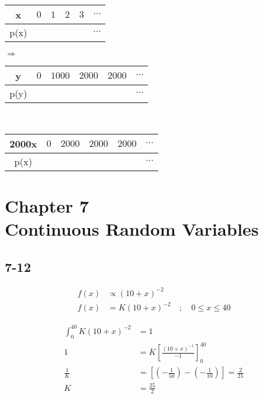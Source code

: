 \documentclass{article}
\begin{document}
			\begin{center}
				\begin{tabular}{c|c|c|c|c|c}
					x & $0$ & $1$ & $2$ & $3$ & $\cdots$ \\
					\hline
					p(x) &  &  &  &  & $\cdots$ \\
				\end{tabular} $\Rightarrow$
				\begin{tabular}{c|c|c|c|c|c}
					y & $0$ & $1000$ & $2000$ & $2000$ & $\cdots$ \\
					\hline
					p(y) &  &  &  &  & $\cdots$ \\
				\end{tabular}
				\\
				\begin{tabular}{c|c|c|c|c|c}
					2000x & $0$ & $2000$ & $2000$ & $2000$ & $\cdots$ \\
					\hline
					p(x) &  &  &  &  & $\cdots$ \\
				\end{tabular}
			\end{center}

	\clearpage

	\section[Chapter 7: Continuous Random Variables]{Chapter 7 \\
		Continuous Random Variables}

		\subsection*{7-12}

			\begin{equation*}
				\begin{split}
					f(x) &\propto \left( 10 + x \right)^{-2} \\
					f(x) &= K \left( 10 + x \right)^{-2} \quad ; \quad 0 \leq x \leq 40
				\end{split}
			\end{equation*}

			\begin{equation*}
				\begin{split}
					\int_{0}^{40} K \left( 10 + x \right)^{-2} &= 1 \\
					1 &= K \left[ \frac{(10 + x)^{-1}}{-1} \right]^{40}_0 \\
					\frac{1}{K} &= \left[ \left(-\frac{1}{50}\right) - \left(-\frac{1}{10}\right) \right] = \frac{2}{25} \\
					K &= \frac{25}{2}
				\end{split}
			\end{equation*}
\end{document}

